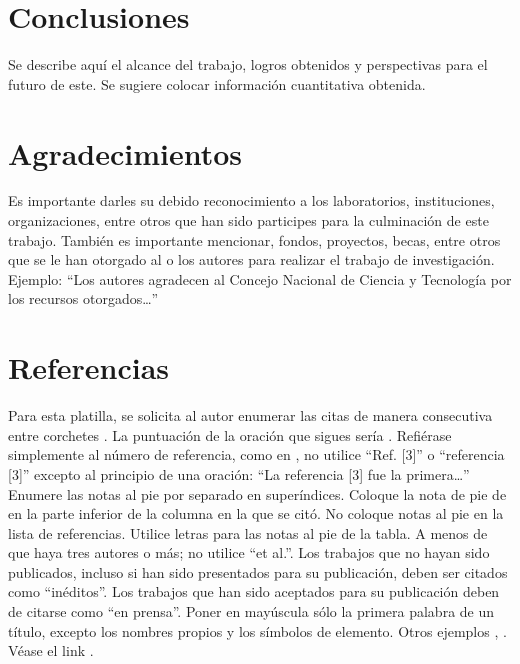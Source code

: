     \section{Conclusiones}
    
    Se describe aquí el alcance del trabajo, logros obtenidos y perspectivas para el futuro de este. Se sugiere colocar información cuantitativa obtenida.
    
    \section{Agradecimientos}
    
    Es importante darles su debido reconocimiento a los laboratorios, instituciones, organizaciones, entre otros que han sido participes para la culminación de este trabajo. También es importante mencionar, fondos, proyectos, becas, entre otros que se le han otorgado al o los autores para realizar el trabajo de investigación. Ejemplo: “Los autores agradecen al Concejo Nacional de Ciencia y Tecnología por los recursos otorgados…”
    
    \section*{Referencias}
    
    Para esta platilla, se solicita al autor enumerar las citas de manera consecutiva entre corchetes \cite{YLi2013}. 
    La puntuación de la oración que sigues sería \cite{Mesaelides2011}. 
    Refiérase simplemente al número de referencia, como en \cite{Morales2012}, no utilice “Ref. [3]” o “referencia [3]” excepto al principio de una oración: “La referencia [3] fue la primera…”
    Enumere las notas al pie por separado en superíndices. Coloque la nota de pie de en la parte inferior de la columna en la que se citó. No coloque notas al pie en la lista de referencias. Utilice letras para las notas al pie de la tabla.
    A menos de que haya tres autores o más; no utilice “et al.”. Los trabajos que no hayan sido publicados, incluso si han sido presentados para su publicación, deben ser citados como “inéditos”. Los trabajos que han sido aceptados para su publicación deben de citarse como “en prensa”. Poner en mayúscula sólo la primera palabra de un título, excepto los nombres propios y los símbolos de elemento. 
    Otros ejemplos \cite{LAAngeles2021}, \cite{LAAngelesConni}. 
    Véase el link \cite{prueba}.
    
    
